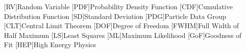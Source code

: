 
\begin{acronym}[FWHM]
	[RV]{Random Variable}
	[PDF]{Probability Density Function}
	[CDF]{Cumulative Distribution Function}
	[SD]{Standard Deviation}
	[PDG]{Particle Data Group}
	[CLT]{Central Limit Theorem}
	[DOF]{Degree of Freedom}
	[FWHM]{Full Width of Half Maximum}
	[LS]{Least Squares}
	[ML]{Maximum Likelihood}
	[GoF]{Goodness of Fit}
	[HEP]{High Energy Physics}
\end{acronym}
